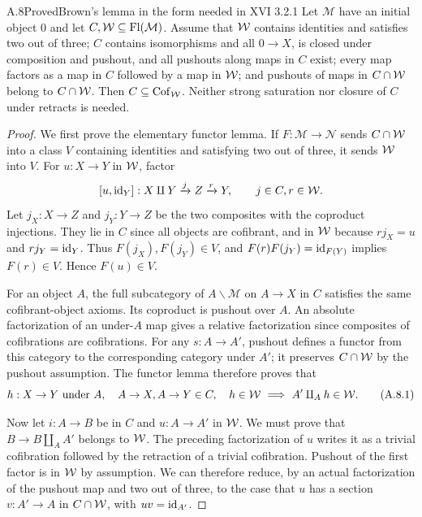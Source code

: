 \begin{claim}{A.8}{Proved}{Brown's lemma in the form needed in XVI 3.2.1}
Let $\mathcal M$ have an initial object $0$ and let $C,\mathcal{W}\subseteq\operatorname{Fl}(\mathcal M)$. Assume that $\mathcal{W}$ contains identities and satisfies two out of three; $C$ contains isomorphisms and all $0\to X$, is closed under composition and pushout, and all pushouts along maps in $C$ exist; every map factors as a map in $C$ followed by a map in $\mathcal{W}$; and pushouts of maps in $C\cap\mathcal{W}$ belong to $C\cap\mathcal{W}$. Then $C\subseteq\operatorname{Cof}_{\mathcal{W}}$. Neither strong saturation nor closure of $C$ under retracts is needed.
\end{claim}
\begin{proof}
We first prove the elementary functor lemma. If $F:\mathcal M\to\mathcal N$ sends $C\cap\mathcal{W}$ into a class $V$ containing identities and satisfying two out of three, it sends $\mathcal{W}$ into $V$. For $u:X\to Y$ in $\mathcal{W}$, factor
\[
[u,\mathrm{id}_Y]:X\amalg Y\xrightarrow{j}Z\xrightarrow{r}Y,
\qquad j\in C, r\in\mathcal{W}.
\]
Let $j_X:X\to Z$ and $j_Y:Y\to Z$ be the two composites with the coproduct injections. They lie in $C$ since all objects are cofibrant, and in $\mathcal{W}$ because $rj_X=u$ and $rj_Y=\mathrm{id}_Y$. Thus $F(j_X),F(j_Y)\in V$, and $F(r)F(j_Y)=\mathrm{id}_{F(Y)}$ implies $F(r)\in V$. Hence $F(u)\in V$.

For an object $A$, the full subcategory of $A\backslash\mathcal M$ on $A\to X$ in $C$ satisfies the same cofibrant-object axioms. Its coproduct is pushout over $A$. An absolute factorization of an under-$A$ map gives a relative factorization since composites of cofibrations are cofibrations. For any $s:A\to A'$, pushout defines a functor from this category to the corresponding category under $A'$; it preserves $C\cap\mathcal{W}$ by the pushout assumption. The functor lemma therefore proves that
\[
h:X\to Y\text{ under }A,\quad A\to X,A\to Y\in C,\quad h\in\mathcal{W}
\ \Longrightarrow\ A'\amalg_A h\in\mathcal{W}.                    \tag{A.8.1}
\]

Now let $i:A\to B$ be in $C$ and $u:A\to A'$ in $\mathcal{W}$. We must prove that $B\to B\amalg_A A'$ belongs to $\mathcal{W}$. The preceding factorization of $u$ writes it as a trivial cofibration followed by the retraction of a trivial cofibration. Pushout of the first factor is in $\mathcal{W}$ by assumption. We can therefore reduce, by an actual factorization of the pushout map and two out of three, to the case that $u$ has a section $v:A'\to A$ in $C\cap\mathcal{W}$, with $uv=\mathrm{id}_{A'}$.


\end{proof}
